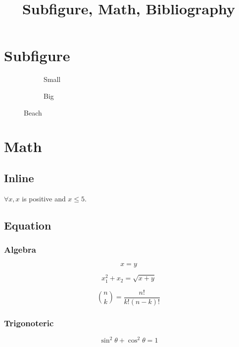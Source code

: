 \documentclass[a4paper, 12pt]{article}
\title{Subfigure, Math, Bibliography}
\begin{document}
	\maketitle
	\tableofcontents
	\listoffigures
	\newpage
	
	\section{Subfigure}
	\begin{figure}[h]
		\begin{subfigure}{0.2\textwidth}
			\centering
			\caption{Small}
		\end{subfigure}
		\begin{subfigure}{0.6\textwidth}
			\centering
			\caption{Big}
		\end{subfigure}
		\caption{Beach}	
	\end{figure}
	\section{Math}
	\subsection{Inline}
		$\forall x, x$ is positive and  $x \leq 5$.
	
	\subsection{Equation}
	
	\subsubsection{Algebra}
		\begin{equation}
			x = y
		\end{equation}
		
		\begin{equation*}
			x_1^2 + x_2 = \sqrt{x+y}
		\end{equation*}	
		
		\begin{equation}
			\binom{n}{k} = \frac{n!}{k!(n-k)!}
		\end{equation}		
	\subsubsection{Trigonoteric}
		\begin{equation}
			\sin^2\theta + \cos^2\theta = 1
		\end{equation}
		
\end{document}
